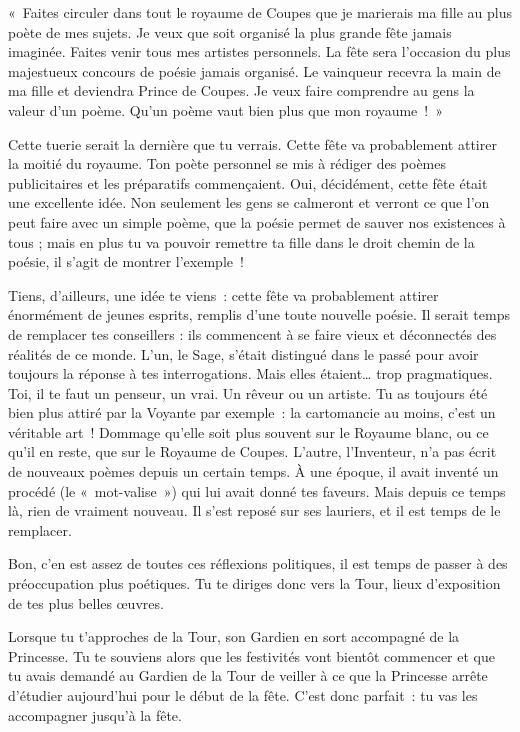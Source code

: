 {{«~Faites circuler dans tout le royaume de Coupes que je marierais ma fille au plus poète de mes sujets.
Je veux que soit organisé la plus grande fête jamais imaginée.  Faites venir tous mes artistes personnels.
La fête sera l’occasion du plus majestueux concours de poésie jamais organisé.
Le vainqueur recevra la main de ma fille et deviendra Prince de Coupes.
Je veux faire comprendre au gens la valeur d’un poème.  Qu’un poème vaut bien plus que mon royaume~!~»

Cette tuerie serait la dernière que tu verrais.
Cette fête va probablement attirer la moitié du royaume.  Ton poète personnel se mis à rédiger des poèmes publicitaires et les préparatifs commençaient.
Oui, décidément, cette fête était une excellente idée.
Non seulement les gens se calmeront et verront ce que l’on peut faire avec un simple poème, que la poésie permet de sauver nos existences à tous ; mais en plus tu va pouvoir remettre ta fille dans le droit chemin de la poésie, il s’agit de montrer l’exemple~!

Tiens, d’ailleurs, une idée te viens~:  cette fête va probablement attirer énormément de jeunes esprits, remplis d’une toute nouvelle poésie.
Il serait temps de remplacer tes conseillers :  ils commencent à se faire vieux et déconnectés des réalités de ce monde.
L’un, le Sage, s’était distingué dans le passé pour avoir toujours la réponse à tes interrogations.  Mais elles étaient… trop pragmatiques.  Toi, il te faut un penseur, un vrai.  Un rêveur ou un artiste.
Tu as toujours été bien plus attiré par la Voyante par exemple~:  la cartomancie au moins, c’est un véritable art~!  Dommage qu’elle soit plus souvent sur le Royaume blanc, ou ce qu’il en reste, que sur le Royaume de Coupes.
L’autre, l’Inventeur, n’a pas écrit de nouveaux poèmes depuis un certain temps.
À une époque, il avait inventé un procédé (le «~mot-valise~») qui lui avait donné tes faveurs.  Mais depuis ce temps là, rien de vraiment nouveau.
Il s’est reposé sur ses lauriers, et il est temps de le remplacer.

Bon, c’en est assez de toutes ces réflexions politiques, il est temps de passer à des préoccupation plus poétiques.
Tu te diriges donc vers la Tour, lieux d’exposition de tes plus belles œuvres.

Lorsque tu t’approches de la Tour, son Gardien en sort accompagné de la Princesse.
Tu te souviens alors que les festivités vont bientôt commencer et que tu avais demandé au Gardien de la Tour de veiller à ce que la Princesse arrête d’étudier aujourd’hui pour le début de la fête.
C’est donc parfait~:  tu vas les accompagner jusqu’à la fête.
}

}


